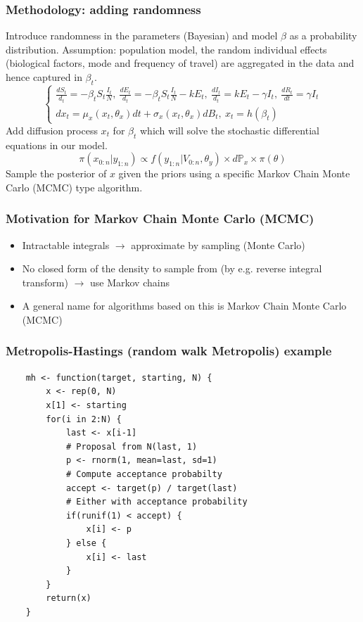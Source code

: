 \documentclass{beamer}
\begin{document}
\begin{frame}
\frametitle{Methodology: adding randomness}
Introduce randomness in the parameters (Bayesian) and model $\beta$ as a probability distribution. Assumption: population model, the random individual effects (biological factors, mode and frequency of travel) are aggregated in the data and hence captured in $\beta_t$.
$$\left\{\begin{array}{ll}\frac{dS_t}{d_t}=-\beta_t S_t \frac{I_t}{N}, \: \frac{dE_t}{d_t}=-\beta_t S_t \frac{I_t}{N} - kE_t, \: \frac{dI_t}{d_t}=kE_t-\gamma I_t, \: \frac{dR_t}{dt}=\gamma I_t \\ dx_t = \mu_x(x_t, \theta_x)dt+\sigma_x(x_t,\theta_x)dB_t, \: x_t=h(\beta_t)\end{array}\right.$$
Add diffusion process $x_t$ for $\beta_t$ which will solve the stochastic differential equations in our model.
$$\pi(x_{0:n}|y_{1:n}) \propto f(y_{1:n}|V_{0:n}, \theta_y) \times d\mathbb{P}_x \times \pi(\theta)$$
Sample the posterior of $x$ given the priors using a specific Markov Chain Monte Carlo (MCMC) type algorithm.
\end{frame}

\begin{frame}
    \frametitle{Motivation for Markov Chain Monte Carlo (MCMC)}
    \begin{itemize}
        \item Intractable integrals $\rightarrow$ approximate by sampling (Monte Carlo)
        \item No closed form of the density to sample from (by e.g. reverse integral transform) $\rightarrow$ use Markov chains
        \item A general name for algorithms based on this is Markov Chain Monte Carlo (MCMC)
    \end{itemize}
\end{frame}

\begin{frame}[fragile]
    \frametitle{Metropolis-Hastings (random walk Metropolis) example}
    \begin{lstlisting}
    mh <- function(target, starting, N) {
        x <- rep(0, N)
        x[1] <- starting
        for(i in 2:N) {
            last <- x[i-1]
            # Proposal from N(last, 1)
            p <- rnorm(1, mean=last, sd=1)
            # Compute acceptance probabilty
            accept <- target(p) / target(last)
            # Either with acceptance probability
            if(runif(1) < accept) {
                x[i] <- p
            } else {
                x[i] <- last
            }
        }
        return(x)
    }
    \end{lstlisting}
\end{frame}
\end{document}
